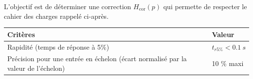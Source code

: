 \documentclass[10pt,fleqn]{article} %
\begin{document}
\begin{multicols}{2}
\begin{center}
\end{center}



\begin{obj}
L'objectif est de déterminer une correction  $H_{\text{cor}}( p)$ qui permette de respecter le cahier des charges
rappelé ci-après.
\end{obj}

\begin{center}
\begin{tabular}{|p{5.5cm}|l|}
\hline
Critères & Valeur \\ \hline\hline
Rapidité (temps de réponse à 5\%) & $t_{r5\%}<\SI{0,1}{s}$ \\ \hline
Précision pour une entrée en échelon
(écart normalisé par la valeur de l'échelon) & 10 \% maxi \\
\hline
\end{tabular}
\end{center}

%
%
%
%
%
%
%
%
%
%
%



\end{multicols}
\end{document}
